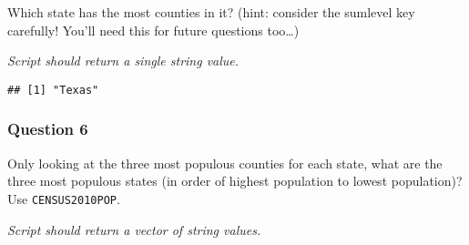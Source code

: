 \documentclass[
]{article}
\newenvironment{Shaded}{\begin{snugshade}}{\end{snugshade}}
\newcommand{\DataTypeTok}[1]{\textcolor[rgb]{0.13,0.29,0.53}{#1}}
\newcommand{\DecValTok}[1]{\textcolor[rgb]{0.00,0.00,0.81}{#1}}
\newcommand{\KeywordTok}[1]{\textcolor[rgb]{0.13,0.29,0.53}{\textbf{#1}}}
\newcommand{\NormalTok}[1]{#1}
\newcommand{\OperatorTok}[1]{\textcolor[rgb]{0.81,0.36,0.00}{\textbf{#1}}}
\newcommand{\StringTok}[1]{\textcolor[rgb]{0.31,0.60,0.02}{#1}}
\begin{document}
Which state has the most counties in it? (hint: consider the sumlevel
key carefully! You'll need this for future questions too\ldots)

\emph{Script should return a single string value.}

\begin{Shaded}
\end{Shaded}

\begin{verbatim}
## [1] "Texas"
\end{verbatim}

\hypertarget{question-6}{%
\subsubsection{Question 6}\label{question-6}}

Only looking at the three most populous counties for each state, what
are the three most populous states (in order of highest population to
lowest population)? Use \texttt{CENSUS2010POP}.

\emph{Script should return a vector of string values.}

\begin{Shaded}
\end{Shaded}
\end{document}
